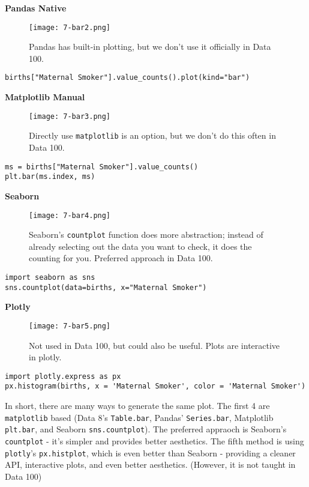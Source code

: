\textbf{Pandas Native}

\begin{figure}[ht]
\texttt{[image: 7-bar2.png]}\centering\caption{Pandas has built-in plotting, but we don't use it officially in Data 100.}
\end{figure}
\begin{verbatim}
births["Maternal Smoker"].value_counts().plot(kind="bar")
\end{verbatim}

\textbf{Matplotlib Manual}

\begin{figure}[ht]
\texttt{[image: 7-bar3.png]}\centering\caption{Directly use \texttt{matplotlib} is an option, but we don't do this often in Data 100.}
\end{figure}
\begin{verbatim}
ms = births["Maternal Smoker"].value_counts()
plt.bar(ms.index, ms)
\end{verbatim}

\textbf{Seaborn}

\begin{figure}[ht]
\texttt{[image: 7-bar4.png]}\centering\caption{Seaborn's \texttt{countplot} function does more abstraction; instead of already selecting out the data you want to check, it does the counting for you. Preferred approach in Data 100.}
\end{figure}
\begin{verbatim}
import seaborn as sns
sns.countplot(data=births, x="Maternal Smoker")
\end{verbatim}

\textbf{Plotly}

\begin{figure}[ht]
\texttt{[image: 7-bar5.png]}\centering\caption{Not used in Data 100, but could also be useful. Plots are interactive in plotly.}
\end{figure}
\begin{verbatim}
import plotly.express as px
px.histogram(births, x = 'Maternal Smoker', color = 'Maternal Smoker')
\end{verbatim}

In short, there are many ways to generate the same plot. The first 4 are \texttt{matplotlib} based (Data 8's \texttt{Table.bar}, Pandas' \texttt{Series.bar}, Matplotlib \texttt{plt.bar}, and Seaborn \texttt{sns.countplot}). The preferred appraoch is Seaborn's \texttt{countplot} - it's simpler and provides better aesthetics. The fifth method is using \texttt{plotly}'s \texttt{px.histplot}, which is even better than Seaborn - providing a cleaner API, interactive plots, and even better aesthetics. (However, it is not taught in Data 100)

